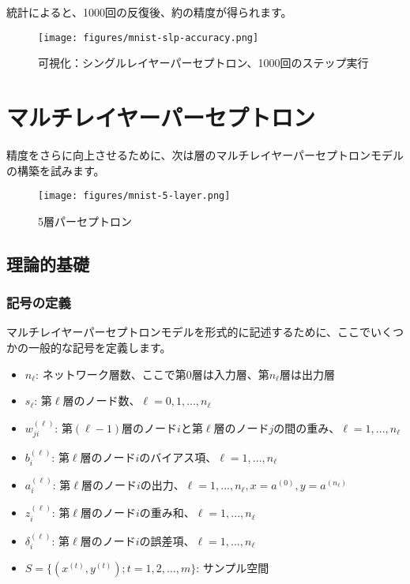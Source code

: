 \begin{content}
\begin{content}
統計によると、1000回の反復後、約の精度が得られます。

\begin{figure}[H]
\centering
\texttt{[image: figures/mnist-slp-accuracy.png]}
\caption{可視化：シングルレイヤーパーセプトロン、1000回のステップ実行}
 \label{fig:mnist-slp-accuracy}
\end{figure}

\end{content}

\section{マルチレイヤーパーセプトロン}

\begin{content}

精度をさらに向上させるために、次は層のマルチレイヤーパーセプトロンモデルの構築を試みます。

\begin{figure}[H]
\centering
\texttt{[image: figures/mnist-5-layer.png]}
\caption{5層パーセプトロン}
 \label{fig:mnist-5-layer}
\end{figure}

\subsection{理論的基礎}

\subsubsection{記号の定義}

マルチレイヤーパーセプトロンモデルを形式的に記述するために、ここでいくつかの一般的な記号を定義します。

\begin{itemize}
   \item \alert{$ {n_{\ell}} $}: ネットワーク層数、ここで第$0$層は入力層、第$n_{\ell}$層は出力層
   \item \alert{$ {s_{\ell}} $}: 第$\ell$層のノード数、$ \ell = 0, 1, ..., n_{\ell} $
   \item \alert{$ w_{ji}^{(\ell)} $}: 第$(\ell-1)$層のノード$i$と第$\ell$層のノード$j$の間の重み、$ \ell = 1, ..., n_{\ell} $
   \item \alert{$ b_i^{(\ell)} $}: 第$\ell$層のノード$i$のバイアス項、$ \ell = 1, ..., n_{\ell} $
   \item \alert{$ a_i^{(\ell)} $}: 第$\ell$層のノード$i$の出力、$ \ell = 1, ..., n_{\ell}, x = a^{(0)}, y = a^{(n_{\ell})} $
   \item \alert{$ z_i^{(\ell)} $}: 第$\ell$層のノード$i$の重み和、$ \ell = 1, ..., n_{\ell} $
   \item \alert{$ \delta _i^{(\ell)} $}: 第$\ell$層のノード$i$の誤差項、$ \ell = 1, ..., n_{\ell} $
   \item \alert{$ S = \{ ({x^{(t)}},{y^{(t)}});t = 1,2,...,m\} $}: サンプル空間
 \end{itemize}


\end{content}
\end{content}
